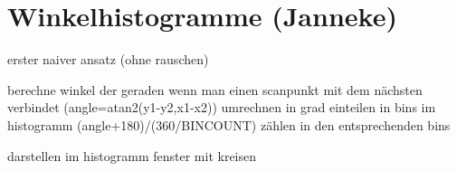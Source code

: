 \section{Winkelhistogramme (Janneke)}

erster naiver ansatz (ohne rauschen)

berechne winkel der geraden wenn man einen scanpunkt mit dem nächsten verbindet (angle=atan2(y1-y2,x1-x2))
umrechnen in grad
einteilen in bins im histogramm (angle+180)/(360/BINCOUNT)
zählen in den entsprechenden bins

darstellen im histogramm fenster mit kreisen
